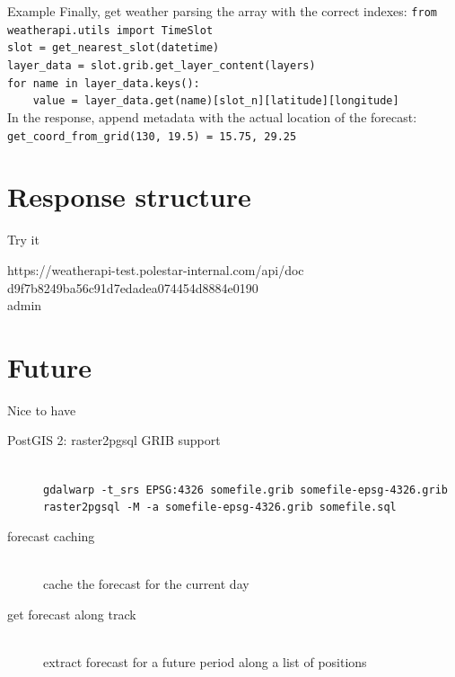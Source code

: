\documentclass[xcolor=svgnames]{beamer}
\begin{document}
    \begin{frame}{Example}
        Finally, get weather parsing the array with the correct indexes:
        \vspace{0.05\textheight}
        \scriptsize{
            \texttt{from weatherapi.utils import TimeSlot}\\
            \texttt{slot = get\_nearest\_slot(datetime)}\\
            \texttt{layer\_data = slot.grib.get\_layer\_content(layers)}\\
            \texttt{for name in layer\_data.keys():}\\
            \texttt{~~~~value = layer\_data.get(name)[slot\_n][latitude][longitude]}\\
        }
        \vspace{0.05\textheight}
        In the response, append metadata with the actual location of the forecast:
        \texttt{get\_coord\_from\_grid(130, 19.5) = 15.75, 29.25}
    \end{frame}

\section{Response structure}

\begin{frame}{Try it}
        \begin{center}
            \large https://weatherapi-test.polestar-internal.com/api/doc\\
            \vspace{0.05\textheight}
            d9f7b8249ba56c91d7edadea074454d8884e0190\\
            admin
        \end{center}
    \end{frame}

\section{Future}

    \begin{frame}{Nice to have}
        \begin{description}
            \item[PostGIS 2: raster2pgsql GRIB support]~\\
                    \texttt{gdalwarp -t\_srs EPSG:4326 somefile.grib somefile-epsg-4326.grib}\\
                    \texttt{raster2pgsql -M -a somefile-epsg-4326.grib somefile.sql}

            \item[forecast caching]~\\cache the forecast for the current day
            \item[get forecast along track]~\\extract forecast for a future period along a list of positions
        \end{description}
    \end{frame}
\end{document}
